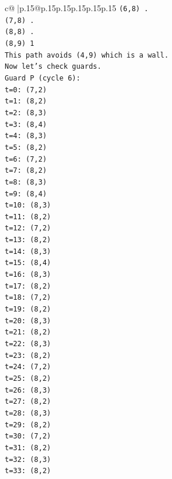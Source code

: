\documentclass{article}
\begin{document}
{\begin{supertabular}{c@{$\;$}|p{.15\linewidth}@{}p{.15\linewidth}p{.15\linewidth}p{.15\linewidth}p{.15\linewidth}p{.15\linewidth}}
{{{\texttt{(6,8) .} \\
\texttt{(7,8) .} \\
\texttt{(8,8) .} \\
\texttt{(8,9) 1} \\
\texttt{This path avoids (4,9) which is a wall.} \\
\texttt{Now let's check guards.} \\
\texttt{Guard P (cycle 6):} \\
\texttt{t=0: (7,2)} \\
\texttt{t=1: (8,2)} \\
\texttt{t=2: (8,3)} \\
\texttt{t=3: (8,4)} \\
\texttt{t=4: (8,3)} \\
\texttt{t=5: (8,2)} \\
\texttt{t=6: (7,2)} \\
\texttt{t=7: (8,2)} \\
\texttt{t=8: (8,3)} \\
\texttt{t=9: (8,4)} \\
\texttt{t=10: (8,3)} \\
\texttt{t=11: (8,2)} \\
\texttt{t=12: (7,2)} \\
\texttt{t=13: (8,2)} \\
\texttt{t=14: (8,3)} \\
\texttt{t=15: (8,4)} \\
\texttt{t=16: (8,3)} \\
\texttt{t=17: (8,2)} \\
\texttt{t=18: (7,2)} \\
\texttt{t=19: (8,2)} \\
\texttt{t=20: (8,3)} \\
\texttt{t=21: (8,2)} \\
\texttt{t=22: (8,3)} \\
\texttt{t=23: (8,2)} \\
\texttt{t=24: (7,2)} \\
\texttt{t=25: (8,2)} \\
\texttt{t=26: (8,3)} \\
\texttt{t=27: (8,2)} \\
\texttt{t=28: (8,3)} \\
\texttt{t=29: (8,2)} \\
\texttt{t=30: (7,2)} \\
\texttt{t=31: (8,2)} \\
\texttt{t=32: (8,3)} \\
\texttt{t=33: (8,2)} \\
}}}
\end{supertabular}}
\end{document}
